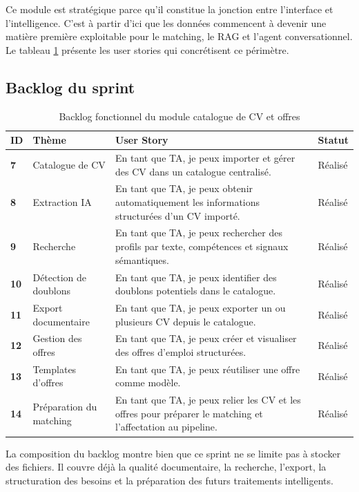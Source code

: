 Ce module est stratégique parce qu'il constitue la jonction entre l'interface et l'intelligence. C'est à partir d'ici que les données commencent à devenir une matière première exploitable pour le matching, le RAG et l'agent conversationnel.
Le tableau \ref{tab:cv-jobs-backlog} présente les user stories qui concrétisent ce périmètre.

\subsection{Backlog du sprint}
\begin{table}[H]
  \centering
  \caption{\label{tab:cv-jobs-backlog}Backlog fonctionnel du module catalogue de CV et offres}
  \begin{tabularx}{\textwidth}{>{\bfseries}p{1.3cm}p{3cm}X>{\raggedright\arraybackslash}p{2cm}}
    \toprule
    ID & Thème & User Story & Statut \\
    \midrule
    7 & Catalogue de CV & En tant que TA, je peux importer et gérer des CV dans un catalogue centralisé. & Réalisé \\
    8 & Extraction IA & En tant que TA, je peux obtenir automatiquement les informations structurées d'un CV importé. & Réalisé \\
    9 & Recherche & En tant que TA, je peux rechercher des profils par texte, compétences et signaux sémantiques. & Réalisé \\
    10 & Détection de doublons & En tant que TA, je peux identifier des doublons potentiels dans le catalogue. & Réalisé \\
    11 & Export documentaire & En tant que TA, je peux exporter un ou plusieurs CV depuis le catalogue. & Réalisé \\
    12 & Gestion des offres & En tant que TA, je peux créer et visualiser des offres d'emploi structurées. & Réalisé \\
    13 & Templates d'offres & En tant que TA, je peux réutiliser une offre comme modèle. & Réalisé \\
    14 & Préparation du matching & En tant que TA, je peux relier les CV et les offres pour préparer le matching et l'affectation au pipeline. & Réalisé \\
    \bottomrule
  \end{tabularx}
\end{table}

La composition du backlog montre bien que ce sprint ne se limite pas à stocker des fichiers. Il couvre déjà la qualité documentaire, la recherche, l'export, la structuration des besoins et la préparation des futurs traitements intelligents.

